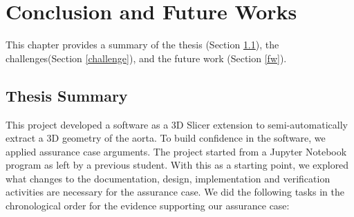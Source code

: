 \chapter{Conclusion and Future Works}

This chapter provides a summary of the thesis (Section \ref{thesis_sum}), the challenges(Section \ref{challenge}), and the future work (Section \ref{fw}).

\section{Thesis Summary}\label{thesis_sum}

This project developed a software as a 3D Slicer extension to semi-automatically extract a 3D geometry of the aorta. To build confidence in the software, we applied assurance case arguments. The project started from a Jupyter Notebook program as left by a previous student. With this as a starting point, we explored what changes to the documentation, design, implementation and verification activities are necessary for the assurance case. We did the following tasks in the chronological order for the evidence supporting our assurance case:

